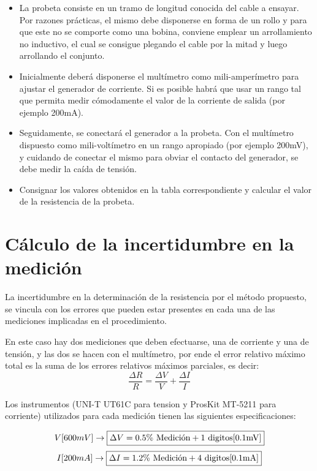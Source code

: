 \begin{itemize}
  \item La probeta consiste en un tramo de longitud conocida del cable a ensayar. Por razones prácticas, el mismo debe disponerse en forma de un rollo y para que este no se comporte como una bobina, conviene emplear un arrollamiento no inductivo, el cual se consigue plegando el cable por la mitad y luego arrollando el conjunto.
  \item Inicialmente deberá disponerse el multímetro como mili-amperímetro para ajustar el generador de corriente. Si es posible habrá que usar un rango tal que permita medir cómodamente el valor de la corriente de salida (por ejemplo 200mA).
  \item Seguidamente, se conectará el generador a la probeta. Con el multímetro dispuesto como mili-voltímetro en un rango apropiado (por ejemplo 200mV), y cuidando de conectar el mismo para obviar el contacto del generador, se debe medir la caída de tensión.
  \item Consignar los valores obtenidos en la tabla correspondiente y calcular el valor de la resistencia de la probeta.
\end{itemize}

\section{Cálculo de la incertidumbre en la medición}
La incertidumbre en la determinación de la resistencia por el método propuesto, se vincula con los errores que pueden estar presentes en cada una de las mediciones implicadas en el procedimiento.

En este caso hay dos mediciones que deben efectuarse, una de corriente y una de tensión, y las dos se hacen con el multímetro, por ende el error relativo máximo total es la suma de los errores relativos máximos parciales, es decir:
\begin{equation}\label{eq:1}\dfrac{\Delta R}{R} = \dfrac{\Delta V}{V} + \dfrac{\Delta I}{I}\end{equation}

Los instrumentos (UNI-T UT61C para tension y ProsKit MT-5211 para corriente) utilizados para cada medición tienen las siguientes especificaciones:

$$V[600mV] \rightarrow \framebox{$\Delta V = 0.5\%\text{ Medición} + 1\text{ digitos[0.1mV]}$}$$
$$I[200mA] \rightarrow \framebox{$\Delta I = 1.2\%\text{ Medición} + 4\text{ digitos[0.1mA]}$}$$

